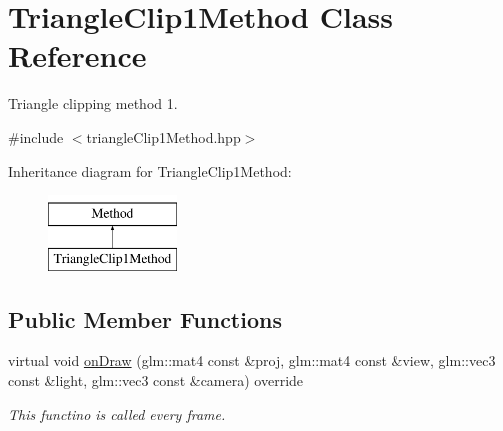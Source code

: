 \hypertarget{classTriangleClip1Method}{}\section{Triangle\+Clip1\+Method Class Reference}
\label{classTriangleClip1Method}


Triangle clipping method 1.  




{\ttfamily \#include $<$triangle\+Clip1\+Method.\+hpp$>$}

Inheritance diagram for Triangle\+Clip1\+Method\+:\begin{figure}[H]
\begin{center}
\leavevmode
\includegraphics[height=2.000000cm]{classTriangleClip1Method}
\end{center}
\end{figure}
\subsection*{Public Member Functions}
\begin{DoxyCompactItemize}
\item 
virtual void \hyperlink{classTriangleClip1Method_a5761d061239fbd8afa2e8c29cc3bef04}{on\+Draw} (glm\+::mat4 const \&proj, glm\+::mat4 const \&view, glm\+::vec3 const \&light, glm\+::vec3 const \&camera) override
\begin{DoxyCompactList}\small\item\em This functino is called every frame. \end{DoxyCompactList}\end{DoxyCompactItemize}
